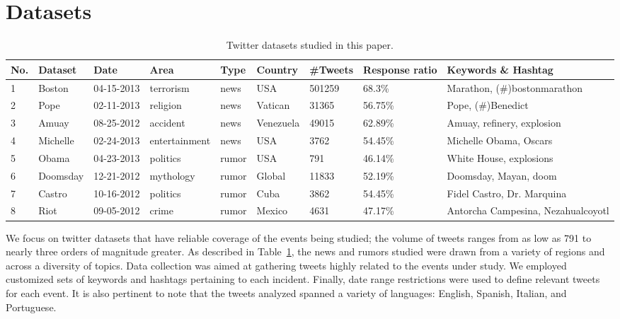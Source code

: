 \section{Datasets}

\begin{table}[!htp]
\tiny
\caption{Twitter datasets studied in this paper.} %
\vspace{0.5em}
\centering %
\begin{tabular}{| p{0.3cm} | p{1.2cm} | p{1.4cm} | p{1.6cm} | p{0.8cm} | p{1.1cm} | p{0.8cm} | p{1.4cm} | p{4.2cm} | }
\hline %
\textbf{No.}& \textbf{Dataset} & \textbf{Date}  & \textbf{Area} & \textbf{Type} & \textbf{Country} & \textbf{\#Tweets} & \textbf{Response ratio} & \textbf{Keywords \& Hashtag}  \\ [1ex] %
\hline %
1& Boston & 04-15-2013&  terrorism& news & USA &  501259 &68.3\% & Marathon, (\#)bostonmarathon \\[1ex]
\hline
2&  Pope & 02-11-2013 &religion&news & Vatican & 31365 &56.75\% &Pope, (\#)Benedict \\[1ex]
\hline
3& Amuay &08-25-2012&  accident &news & Venezuela&49015 &62.89\% &Amuay, refinery, explosion \\[1ex]
\hline
4& Michelle &02-24-2013&  entertainment & news & USA& 3762& 54.45\% &Michelle Obama, Oscars   \\[1ex]
\hline
5& Obama & 04-23-2013&  politics& rumor & USA & 791&46.14\% &White House, explosions    \\[1ex]
\hline
6& Doomsday & 12-21-2012&  mythology& rumor & Global &11833 &52.19\%& Doomsday, Mayan, doom  \\[1ex]
\hline
7& Castro & 10-16-2012&  politics & rumor & Cuba & 3862& 54.45\% &Fidel Castro, Dr. Marquina \\ [1ex]
\hline
8& Riot & 09-05-2012& crime & rumor & Mexico &4631& 47.17\% & Antorcha Campesina, Nezahualcoyotl\\ [1ex]
\hline
\end{tabular}
\label{table:story-intro} %
\end{table}


We focus on twitter datasets that have reliable coverage of the
events being studied; the volume of tweets ranges from as low as
791 to nearly three orders of magnitude greater.
As described in Table~\ref{table:story-intro},
the news and rumors studied were drawn from a variety of
regions and across a diversity of topics.
Data collection was aimed at gathering tweets highly related to the events
under study. We employed customized sets of keywords and hashtags pertaining
to each incident.
Finally, date range restrictions were used to define relevant tweets for
each event. It is also pertinent to note that the tweets analyzed spanned
a variety of languages: English, Spanish, Italian, and Portuguese.


